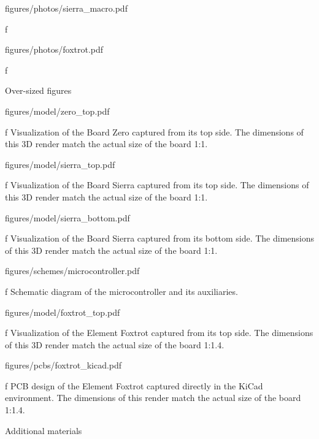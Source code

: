 \midinsert
    \hsize \cinspic figures/photos/sierra_macro.pdf
    \caption/f 
\endinsert

\midinsert
    \picw=14.5cm \cinspic figures/photos/foxtrot.pdf
    \caption/f 
\endinsert



\app Over-sized figures

\midinsert
    \picw=90.17mm \cinspic figures/model/zero_top.pdf
    \caption/f Visualization of the Board Zero captured from its top side. The dimensions of this 3D render match the actual size of the board 1:1.
\endinsert

\midinsert
    \picw=90.17mm \cinspic figures/model/sierra_top.pdf
    \caption/f Visualization of the Board Sierra captured from its top side. The dimensions of this 3D render match the actual size of the board 1:1.
\endinsert

\midinsert
    \picw=90.17mm \cinspic figures/model/sierra_bottom.pdf
    \caption/f Visualization of the Board Sierra captured from its bottom side. The dimensions of this 3D render match the actual size of the board 1:1.
\endinsert

\midinsert
    \hsize \cinspic figures/schemes/microcontroller.pdf
    \caption/f Schematic diagram of the microcontroller and its auxiliaries.
\endinsert

\midinsert
    \picw=14.5cm \cinspic figures/model/foxtrot_top.pdf
    \caption/f Visualization of the Element Foxtrot captured from its top side. The dimensions of this 3D render match the actual size of the board 1:1.4.
\endinsert

\midinsert
    \picw=14.5cm \cinspic figures/pcbs/foxtrot_kicad.pdf
    \caption/f PCB design of the Element Foxtrot captured directly in the KiCad environment. The dimensions of this render match the actual size of the board 1:1.4.
\endinsert




\app Additional materials

